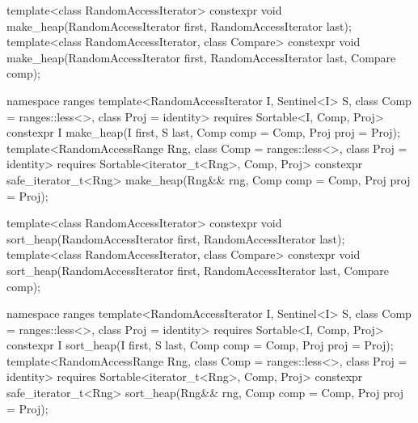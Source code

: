 \begin{codeblock}
  template<class RandomAccessIterator>
    constexpr void make_heap(RandomAccessIterator first, RandomAccessIterator last);
  template<class RandomAccessIterator, class Compare>
    constexpr void make_heap(RandomAccessIterator first, RandomAccessIterator last,
                             Compare comp);
\end{codeblock}\begin{addedblock}\begin{codeblock}
  namespace ranges {
    template<RandomAccessIterator I, Sentinel<I> S, class Comp = ranges::less<>,
        class Proj = identity>
      requires Sortable<I, Comp, Proj>
      constexpr I
        make_heap(I first, S last, Comp comp = Comp{}, Proj proj = Proj{});
    template<RandomAccessRange Rng, class Comp = ranges::less<>, class Proj = identity>
      requires Sortable<iterator_t<Rng>, Comp, Proj>
      constexpr safe_iterator_t<Rng>
        make_heap(Rng&& rng, Comp comp = Comp{}, Proj proj = Proj{});
  }
\end{codeblock}\end{addedblock}\begin{codeblock}

  template<class RandomAccessIterator>
    constexpr void sort_heap(RandomAccessIterator first, RandomAccessIterator last);
  template<class RandomAccessIterator, class Compare>
    constexpr void sort_heap(RandomAccessIterator first, RandomAccessIterator last,
                             Compare comp);
\end{codeblock}\begin{addedblock}\begin{codeblock}
  namespace ranges {
    template<RandomAccessIterator I, Sentinel<I> S, class Comp = ranges::less<>,
        class Proj = identity>
      requires Sortable<I, Comp, Proj>
      constexpr I
        sort_heap(I first, S last, Comp comp = Comp{}, Proj proj = Proj{});
    template<RandomAccessRange Rng, class Comp = ranges::less<>, class Proj = identity>
      requires Sortable<iterator_t<Rng>, Comp, Proj>
      constexpr safe_iterator_t<Rng>
        sort_heap(Rng&& rng, Comp comp = Comp{}, Proj proj = Proj{});
  }
\end{codeblock}\end{addedblock}\begin{codeblock}


\end{codeblock}
